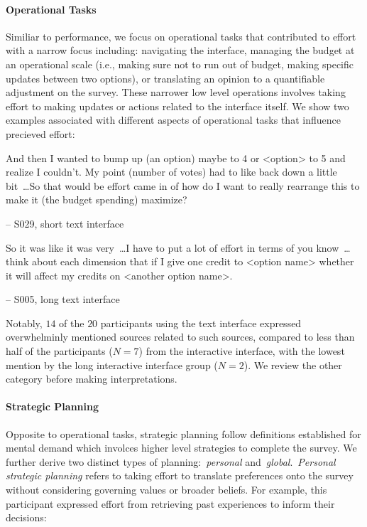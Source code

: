 \paragraph{Operational Tasks} Similiar to performance, we focus on operational tasks that contributed to effort with a narrow focus including: navigating the interface, managing the budget at an operational scale (i.e., making sure not to run out of budget, making specific updates between two options), or translating an opinion to a quantifiable adjustment on the survey. These narrower low level operations involves taking effort to making updates or actions related to the interface itself. We show two examples associated with different aspects of operational tasks that influence precieved effort:

\begin{displayquote}
And then I wanted to bump up (an option) maybe to 4 or <option> to 5 and realize I couldn't. My point (number of votes) had to like back down a little bit~\ldots So that would be effort came in of how do I want to really rearrange this to make it (the budget spending) maximize?

\noindent \hfill -- S029, short text interface
\end{displayquote}

\begin{displayquote}
So it was like it was very~\ldots I have to put a lot of effort in terms of you know~\ldots think about each dimension that if I give one credit to <option name> whether it will affect my credits on <another option name>.

\noindent \hfill -- S005, long text interface
\end{displayquote}

Notably, $14$ of the $20$ participants using the text interface expressed overwhelminly mentioned sources related to such sources, compared to less than half of the participants ($N=7$) from the interactive interface, with the lowest mention by the long interactive interface group ($N=2$). We review the other category before making interpretations.

\paragraph{Strategic Planning} Opposite to operational tasks, strategic planning follow definitions established for mental demand which involces higher level strategies to complete the survey. We further derive two distinct types of planning:~\textit{personal} and~\textit{global}.~\textit{Personal strategic planning} refers to taking effort to translate preferences onto the survey without considering governing values or broader beliefs. For example, this participant expressed effort from retrieving past experiences to inform their decisions:

